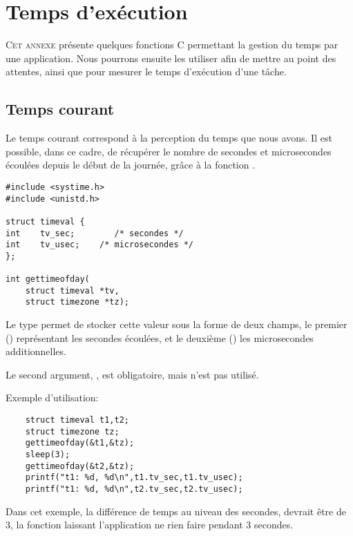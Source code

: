 
\chapter{Temps d'exécution}\label{sec:temps}

\startchapter


\lettrine[lines=4]{C}{et annexe} présente quelques fonctions C permettant la gestion du temps par une application. Nous pourrons ensuite les utiliser afin de mettre au point des attentes, ainsi que pour mesurer le temps d'exécution d'une tâche.

\section{Temps courant}

Le temps courant correspond à la perception du temps que nous avons. Il est possible, dans ce cadre, de récupérer le nombre de secondes et microsecondes écoulées depuis le début de la journée, grâce à la fonction .


\begin{lstlisting}
#include <systime.h>
#include <unistd.h>

struct timeval {
int    tv_sec;        /* secondes */
int    tv_usec;    /* microsecondes */
};

int gettimeofday(
	struct timeval *tv,
	struct timezone *tz);
\end{lstlisting}


 Le type  permet de stocker cette valeur sous la forme de deux champs, le premier () représentant les secondes écoulées, et le deuxième () les microsecondes additionnelles.

Le second argument, , est obligatoire, mais n'est pas utilisé.

Exemple d'utilisation:

\begin{lstlisting}
	struct timeval t1,t2;
	struct timezone tz;
	gettimeofday(&t1,&tz);
	sleep(3);
	gettimeofday(&t2,&tz);
	printf("t1: %d, %d\n",t1.tv_sec,t1.tv_usec);
	printf("t1: %d, %d\n",t2.tv_sec,t2.tv_usec);
\end{lstlisting}

Dans cet exemple, la différence de temps au niveau des secondes, devrait être de 3, la fonction  laissant l'application ne rien faire pendant 3 secondes.



